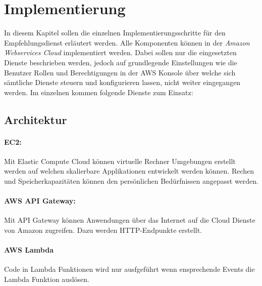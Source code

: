 \section{Implementierung}\label{implementaion}


 In diesem Kapitel sollen die einzelnen Implementierungsschritte für den Empfehlungsdienst erläutert werden. Alle Komponenten können in der \textit{Amazon Webservices Cloud} implementiert werden. Dabei sollen nur die eingesetzten Dienste beschrieben werden, jedoch auf grundlegende Einstellungen wie die Benutzer Rollen und Berechtigungen in der AWS Konsole über welche sich sämtliche Dienste steuern und konfigurieren lassen, nicht weiter eingegangen werden. Im einzelnen kommen folgende Dienste zum Einsatz:

\subsection{Architektur}
\paragraph{EC2:}
\vspace{1em}

Mit Elastic Compute Cloud können virtuelle Rechner Umgebungen erstellt werden auf welchen skalierbare Applikationen entwickelt werden können. Rechen und Speicherkapazitäten können den persönlichen Bedürfnissen angepasst werden. 
\vspace{1em}

\paragraph{AWS API Gateway:}
\vspace{1em}

Mit API Gateway können Anwendungen über das Internet auf die Cloud Dienste von Amazon zugreifen. Dazu werden HTTP-Endpunkte erstellt.
\vspace{1em}

\paragraph{AWS Lambda}
\vspace{1em}

Code in Lambda Funktionen wird nur ausfgeführt wenn ensprechende Events die Lambda Funktion auslösen.

